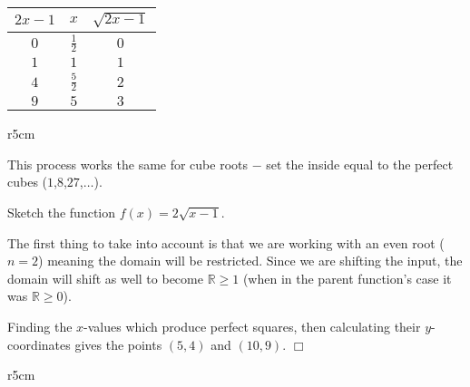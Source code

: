 \documentclass[../book.tex]{subfiles}
\begin{document}
\begin{table}[!h]
    \centering
    \begin{tabular}{|c|c|c|}
       \toprule
        $2x-1$ & $x$ & $\sqrt{2x-1}$ \\
        \midrule
        $0$ & $\frac{1}{2}$ & $0$ \\
        $1$ & $1$ & $1$ \\
        $4$ & $\frac{5}{2}$ & $2$ \\
        $9$ & $5$ & $3$ \\
        \bottomrule
    \end{tabular}
\end{table}

\begin{wrapfigure}{r}{5cm}
\end{wrapfigure}
This process works the same for cube roots $-$ set the inside equal to the perfect cubes ($1$,$8$,$27$,$\ldots$).

\begin{example}
Sketch the function $f(x)=2\sqrt{x-1}$.
\end{example}
\begin{solution}
The first thing to take into account is that we are working with an even root ($n=2$) meaning the domain will be restricted. Since we are shifting the input, the domain will shift as well to become $\mathbb{R}\geq 1$ (when in the parent function’s case it was $\mathbb{R}\geq 0$). 

Finding the $x$-values which produce perfect squares, then calculating their $y$-coordinates gives the points $(5,4)$ and $(10,9)$. $\Box$
\end{solution}

\begin{wrapfigure}{r}{5cm}
\end{wrapfigure}
\end{document}
